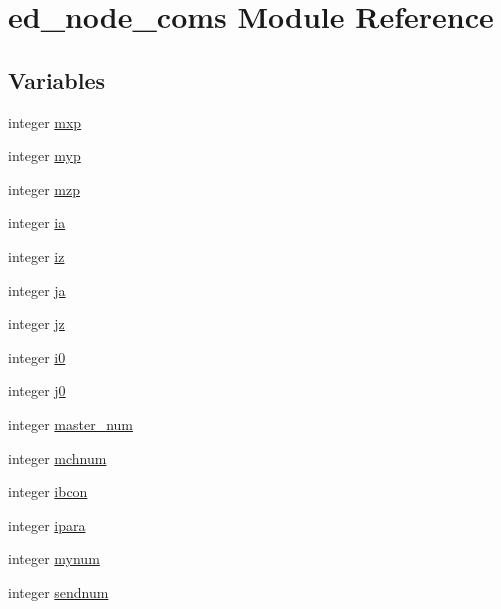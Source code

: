 \hypertarget{namespaceed__node__coms}{}\section{ed\+\_\+node\+\_\+coms Module Reference}
\label{namespaceed__node__coms}
\subsection*{Variables}
\begin{DoxyCompactItemize}
\item 
integer \hyperlink{namespaceed__node__coms_aafd80e646c35b816ee0f00fabe97cc03}{mxp}
\item 
integer \hyperlink{namespaceed__node__coms_a23d910277f538c44e6429f09fa8bcd55}{myp}
\item 
integer \hyperlink{namespaceed__node__coms_a028141a8eb07c83d3f5f8075fbe1d236}{mzp}
\item 
integer \hyperlink{namespaceed__node__coms_a78402c54439b56822a5a8e6812a3ad90}{ia}
\item 
integer \hyperlink{namespaceed__node__coms_a29c92ad4b60b88059dac8a8291b4553b}{iz}
\item 
integer \hyperlink{namespaceed__node__coms_a49471084e0370630b07db902c46c2ea8}{ja}
\item 
integer \hyperlink{namespaceed__node__coms_a58a0ce85c36bbb54b835b48d62281519}{jz}
\item 
integer \hyperlink{namespaceed__node__coms_a6326a182f11b478fe044adfb8a29573f}{i0}
\item 
integer \hyperlink{namespaceed__node__coms_a1767484e9dd38f3c6b443cd2202283a0}{j0}
\item 
integer \hyperlink{namespaceed__node__coms_a07ddd50e92be990673b9c78656aaade5}{master\+\_\+num}
\item 
integer \hyperlink{namespaceed__node__coms_a6eaf5989fc4f739cb5003064f0355966}{mchnum}
\item 
integer \hyperlink{namespaceed__node__coms_a15c70a911fbe3be8baecfaa2c78e5340}{ibcon}
\item 
integer \hyperlink{namespaceed__node__coms_a6b574c65e348d02c2d74df596965828a}{ipara}
\item 
integer \hyperlink{namespaceed__node__coms_a2248da5b8f20480c3d693062b51a186b}{mynum}
\item 
integer \hyperlink{namespaceed__node__coms_ac61164ac357567b425c4b2102af970fb}{sendnum}
\item 

\end{DoxyCompactItemize}
